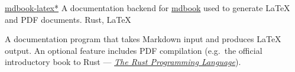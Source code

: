 \showoff
{\textcolor{my-blue}{\href{https://liambeckman.com/mdbook-latex}{mdbook-latex*}}}
{A documentation backend for \textcolor{my-blue}{\href{https://github.com/rust-lang/mdBook}{mdbook}} used to generate \LaTeX{} and PDF documents.}
{Rust, \LaTeX{}}
{}

A documentation program that takes Markdown input and produces \LaTeX{} output. An optional feature includes PDF compilation (e.g.\ the official introductory book to Rust --- \textcolor{my-blue}{\href{https://github.com/lbeckman314/mdbook-latex/releases/latest/download/The.Rust.Programming.Language.pdf}{\emph{The Rust Programming Language}}}).

